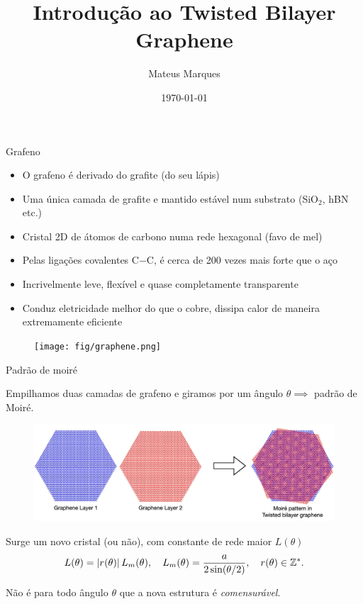 \documentclass[8pt,aspectratio=169,xcolor={table,dvipsnames,usenames}]{beamer}
\title[Introdução ao Twisted Bilayer Graphene]{\LARGE{Introdução ao Twisted Bilayer Graphene}}
\author[Mateus Marques]{
\large{Mateus Marques
}}
\date{\today}
\begin{document}
\begin{frame}
  \titlepage
\end{frame}


\begin{frame}{Grafeno}

\begin{itemize}
\item O grafeno é derivado do grafite (do seu lápis)

\item Uma única camada de grafite e mantido estável num substrato (SiO$_2$, hBN etc.)

\item Cristal 2D de átomos de carbono numa rede hexagonal (favo de mel)

\item Pelas ligações covalentes C$-$C, é cerca de 200 vezes mais forte que o aço

\item Incrivelmente leve, flexível e quase completamente transparente

\item Conduz eletricidade melhor do que o cobre, dissipa calor de maneira extremamente eficiente
\end{itemize}

\begin{figure}[H]
\centering
\texttt{[image: fig/graphene.png]}
\label{fig:graphene}
\end{figure}

\end{frame}


\begin{frame}{Padrão de moiré}

Empilhamos duas camadas de grafeno e giramos por um ângulo $\theta \implies$ padrão de Moiré.

\begin{figure}[H]
\centering
\includegraphics[height=0.30\linewidth]{fig/moire.png}
\label{fig:moire}
\end{figure}

Surge um novo cristal (ou não), com constante de rede maior $L(\theta)$
$$
L(\theta) = \abs{r(\theta)} \, L_m(\theta), \quad L_m(\theta) = \frac{a}{2 \sin(\theta/2)}, \quad r(\theta) \in \mathbb{Z}^*.
$$

Não é para todo ângulo $\theta$ que a nova estrutura é \textit{comensurável}.

\end{frame}
\end{document}
